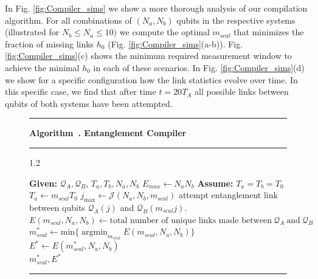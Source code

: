 \documentclass[%
 reprint,
 superscriptaddress,
 amsmath,amssymb,
 aps,
 prx,
]{revtex4-2}
\newcounter{algorithm} %
\newcommand{\algcaption}[1]{%
  \refstepcounter{algorithm}%
  \noindent\rule{\textwidth}{0.8pt}
  \textbf{Algorithm~\thealgorithm. #1}
  \noindent\rule{\textwidth}{0.8pt}
}
\begin{document}
In Fig. \ref{fig:Compiler_sims} we show a more thorough analysis of our compilation algorithm. For all combinations of $(N_a,N_b)$ qubits in the respective systems (illustrated for $N_b\le N_a\le10)$ we compute the optimal $m_{scal}$ that minimizes the fraction of missing links $h_0$ (Fig. \ref{fig:Compiler_sims}(a-b)). Fig. \ref{fig:Compiler_sims}(c) shows the minimum required measurement window to achieve the minimal $h_0$ in each of these scenarios. In Fig. \ref{fig:Compiler_sims}(d) we show for a specific configuration how the link statistics evolve over time. In this specific case, we find that after time $t=20T_A$ all possible links between qubits of both systems have been attempted. 

\begin{figure}[t]
\algcaption{Entanglement Compiler}
\begin{spacing}{1.2}
\label{alg:2}
\begin{algorithmic}[1]
    \State \textbf{Given:} $\mathcal{Q}_{A}, \mathcal{Q}_{B}$, $T_{a}, T_{b}, N_{a}, N_{b}$
    \State \( E_{max} \gets N_{a}N_{b}    \) 
    \State \textbf{Assume:} $T_{a}=T_{b} = T_{0}$
        \State \( T_{a} \gets m_{scal}T_{0}\)
        \State \( j_{\max} \gets \mathcal{J}(N_{a},N_{b},m_{scal})  \)
            \State attempt entanglement link between qubits $\mathcal{Q}_{A}(j)$ and $\mathcal{Q}_{B}(m_{scal}j)$.
        \EndFor
        \State \( E(m_{scal}, N_{a}, N_{b}) \gets \text{total number of unique links made between} ~\mathcal{Q}_{A} ~\text{and}~ \mathcal{Q}_{B}\)
    \EndFor
\State \( m^{*}_{scal} \gets \text{min}\{\operatorname*{argmin}_{m_{scal}} E(m_{scal}, N_{a}, N_{b})\} \)
\State \( E^{*} \gets E(m^{*}_{scal}, N_{a}, N_{b}) \)\\
\Return \( m^{*}_{scal}, E^{*}  \)
\end{algorithmic}
\end{spacing}
\noindent\rule{\textwidth}{0.8pt}
\end{figure}
\end{document}
